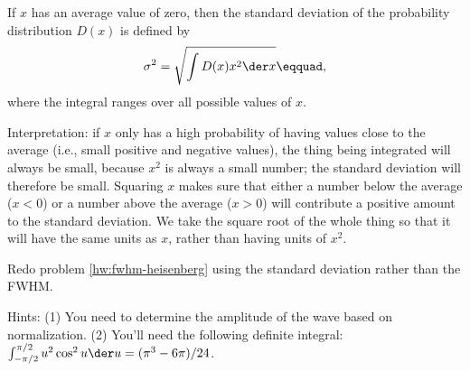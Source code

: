 If $x$ has an average value of zero, then
the standard deviation of the probability distribution $D(x)$ is defined by
\begin{equation*}
  \sigma^2 = \sqrt{\int D(x)x^2 \der x}\eqquad,
\end{equation*}
where the integral ranges over all possible values of $x$.

Interpretation: if $x$ only has a high probability of having values close to the average
(i.e., small positive and negative values), the thing being integrated will always
be small, because $x^2$ is always a small number; the standard deviation will therefore
be small. Squaring $x$ makes sure that either a number below the average ($x<0$) or a number above
the average ($x>0$) will contribute a positive amount to the standard deviation. We take
the square root of the whole thing so that it will have the same units as $x$, rather
than having units of $x^2$.

Redo problem \ref{hw:fwhm-heisenberg} using the standard deviation rather than
the FWHM.

Hints: (1) You need to determine the amplitude of the wave based on normalization.
(2) You'll need the following definite integral:
$\int_{-\pi/2}^{\pi/2} u^2 \cos^2 u \der u = (\pi^3-6\pi)/24$.
\answercheck
